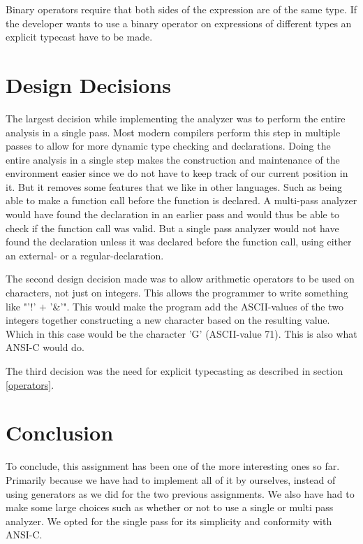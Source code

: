 
Binary operators require that both sides of  the expression are of the same type. If the developer wants to use a binary operator on expressions of different types an explicit typecast have to be made.

\section{Design Decisions}
The largest decision while implementing the analyzer was to perform the entire analysis in a single pass. Most modern compilers perform this step in multiple passes to allow for more dynamic type checking and declarations. Doing the entire analysis in a single step makes the construction and maintenance of the environment easier since we do not have to keep track of our current position in it. But it removes some features that we like in other languages. Such as being able to make a function call before the function is declared. A multi-pass analyzer would have found the declaration in an earlier pass and would thus be able to check if the function call was valid. But a single pass analyzer would not have found the declaration unless it was declared before the function call, using either an external- or a regular-declaration.

The second design decision made was to allow arithmetic operators to be used on characters, not just on integers. This allows the programmer to write something like "'!' $+$ '\&'". This would make the program add the ASCII-values of the two integers together constructing a new character based on the resulting value. Which in this case would be the character 'G' (ASCII-value 71). This is also what ANSI-C would do.

The third decision was the need for explicit typecasting as described in section \ref{operators}.

\section{Conclusion}
To conclude, this assignment has been one of the more interesting ones so far. Primarily because we have had to implement all of it by ourselves, instead of using generators as we did for the two previous assignments. We also have had to make some large choices such as whether or not to use a single or multi pass analyzer. We opted for the single pass for its simplicity and conformity with ANSI-C.
